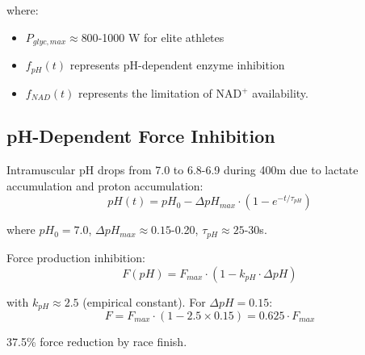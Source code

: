 where:
\begin{itemize}
    \item $P_{glyc,max} \approx 800$-1000 W for elite athletes
    \item $f_{pH}(t)$ represents pH-dependent enzyme inhibition
    \item $f_{NAD}(t)$ represents the limitation of NAD$^+$ availability.
\end{itemize}

\subsection{pH-Dependent Force Inhibition}

Intramuscular pH drops from 7.0 to 6.8-6.9 during 400m due to lactate accumulation and proton accumulation:
\begin{equation}
pH(t) = pH_0 - \Delta pH_{max} \cdot \left(1 - e^{-t/\tau_{pH}}\right)
\end{equation}

where $pH_0 = 7.0$, $\Delta pH_{max} \approx 0.15$-0.20, $\tau_{pH} \approx 25$-30s.

Force production inhibition:
\begin{equation}
F(pH) = F_{max} \cdot \left(1 - k_{pH} \cdot \Delta pH\right)
\end{equation}

with $k_{pH} \approx 2.5$ (empirical constant). For $\Delta pH = 0.15$:
\begin{equation}
F = F_{max} \cdot (1 - 2.5 \times 0.15) = 0.625 \cdot F_{max}
\end{equation}

37.5\% force reduction by race finish.

